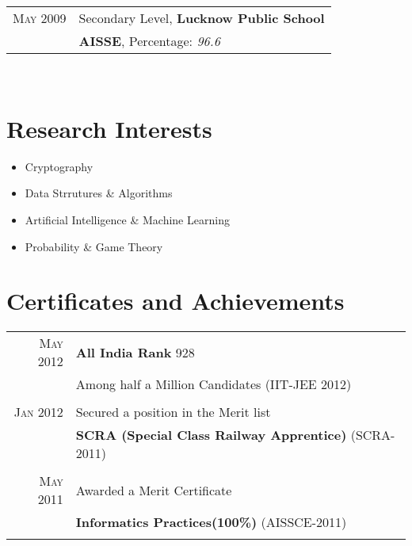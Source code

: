 \documentclass[10pt]{article} %
\begin{document}
{\begin{minipage}[t]{0.5\textwidth}
\begin{tabular}{rl}

\textsc{May} 2009 & Secondary Level, \textbf{Lucknow Public School}\\
&\textbf{AISSE}, Percentage: \emph{96.6}\\

\end{tabular}\\[10pt]


\section{Research Interests} 
\begin{itemize} \itemsep1pt
\item Cryptography 
\item Data Strrutures \& Algorithms
\item Artificial Intelligence \&  Machine Learning
\item Probability \& Game Theory
\end{itemize}
	
\section{Certificates and Achievements}

\begin{tabular}{rl}
\textsc{May} 2012 & \textbf{All India Rank} 928 \\
&Among half a Million Candidates \footnotesize(IIT-JEE 2012)\normalsize\\\\

\textsc{Jan} 2012 & Secured a position in the Merit list\\
&  \textbf{SCRA (Special Class Railway Apprentice) }\footnotesize(SCRA-2011)\normalsize\\\\

\textsc{May} 2011 & Awarded a Merit Certificate\\
& \textbf{Informatics Practices(100\%) }\footnotesize(AISSCE-2011)\normalsize\\\\


\end{tabular}
\end{minipage}}
\end{document}
